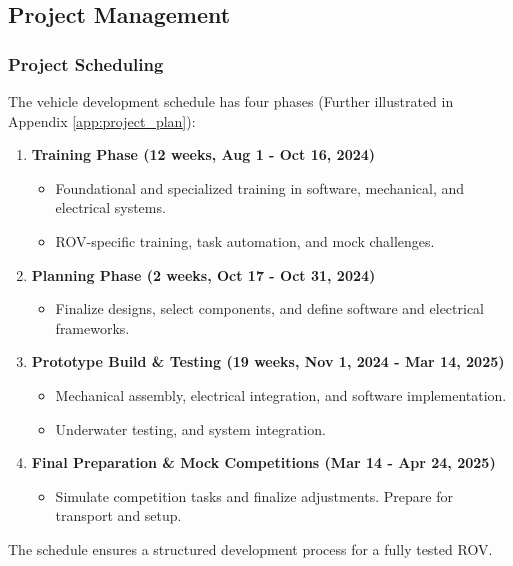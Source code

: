 \subsection{Project Management}

\subsubsection{Project Scheduling}

The vehicle development schedule has four phases (Further illustrated in Appendix \ref{app:project_plan}):

\vspace{-0.5\baselineskip}
\begin{enumerate}[leftmargin=0pt, itemindent=20pt]
    \setlength{\itemsep}{0pt} 
    \item \textbf{Training Phase (12 weeks, Aug 1 - Oct 16, 2024)}
    
    \vspace{-0.5\baselineskip}
    \begin{itemize}[leftmargin=0pt, itemindent=20pt]
        \setlength{\itemsep}{0pt} 
        \item Foundational and specialized training in software, mechanical, and electrical systems.
        \item ROV-specific training, task automation, and mock challenges.
    \end{itemize}
    \item \textbf{Planning Phase (2 weeks, Oct 17 - Oct 31, 2024)}
    \vspace{-0.8cm}
    \begin{itemize}[leftmargin=0pt, itemindent=20pt]
        \setlength{\itemsep}{0pt}
        \item Finalize designs, select components, and define software and electrical frameworks.
    \end{itemize}
    \item \textbf{Prototype Build \& Testing (19 weeks, Nov 1, 2024 - Mar 14, 2025)}
    \vspace{-0.5\baselineskip}
    \begin{itemize}[leftmargin=0pt, itemindent=20pt]
        \setlength{\itemsep}{0pt} 
        \item Mechanical assembly, electrical integration, and software implementation.
        \item Underwater testing, and system integration.
    \end{itemize}
    \item \textbf{Final Preparation \& Mock Competitions (Mar 14 - Apr 24, 2025)}
    
    \vspace{-0.5\baselineskip}
    \begin{itemize}[leftmargin=0pt, itemindent=20pt]
        \setlength{\itemsep}{0pt} 
        \item Simulate competition tasks and finalize adjustments. Prepare for transport and setup.
    \end{itemize}
\end{enumerate}
The schedule ensures a structured development process for a fully tested ROV.

